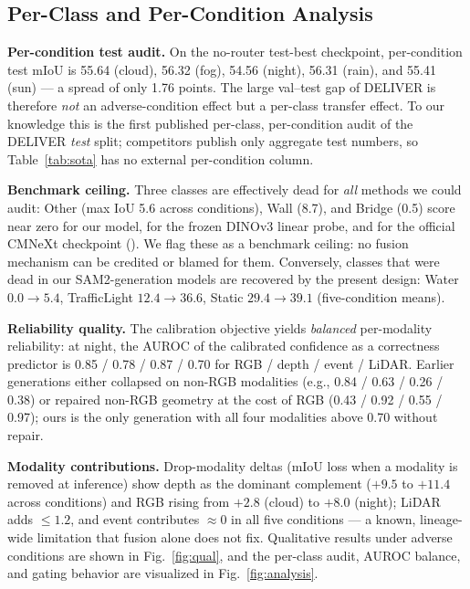 \subsection{Per-Class and Per-Condition Analysis}
\label{sec:analysis}

\textbf{Per-condition test audit.}
On the no-router test-best checkpoint, per-condition test mIoU is
55.64 (cloud), 56.32 (fog), 54.56 (night), 56.31 (rain), and 55.41
(sun) --- a spread of only 1.76 points. The large val--test gap of
DELIVER is therefore \emph{not} an adverse-condition effect but a
per-class transfer effect. To our knowledge this is the first
published per-class, per-condition audit of the DELIVER \emph{test}
split; competitors publish only aggregate test numbers, so
Table~\ref{tab:sota} has no external per-condition column.

\textbf{Benchmark ceiling.}
Three classes are effectively dead for \emph{all} methods we could
audit: Other (max IoU 5.6 across conditions), Wall (8.7), and Bridge
(0.5) score near zero for our model, for the frozen DINOv3 linear
probe, and for the official CMNeXt checkpoint
(). We flag these as a benchmark ceiling: no fusion
mechanism can be credited or blamed for them. Conversely, classes that
were dead in our SAM2-generation models are recovered by the present
design: Water $0.0\rightarrow5.4$, TrafficLight $12.4\rightarrow36.6$,
Static $29.4\rightarrow39.1$ (five-condition means).

\textbf{Reliability quality.}
The calibration objective yields \emph{balanced} per-modality
reliability: at night, the AUROC of the calibrated confidence as a
correctness predictor is 0.85 / 0.78 / 0.87 / 0.70 for RGB / depth /
event / LiDAR. Earlier generations either collapsed on non-RGB
modalities (e.g., 0.84 / 0.63 / 0.26 / 0.38) or repaired non-RGB
geometry at the cost of RGB (0.43 / 0.92 / 0.55 / 0.97); ours is the
only generation with all four modalities above 0.70 without repair.

\textbf{Modality contributions.}
Drop-modality deltas (mIoU loss when a modality is removed at
inference) show depth as the dominant complement ($+9.5$ to $+11.4$
across conditions) and RGB rising from $+2.8$ (cloud) to $+8.0$
(night); LiDAR adds ${\leq}1.2$, and event contributes ${\approx}0$ in
all five conditions --- a known, lineage-wide limitation that fusion
alone does not fix. Qualitative results under adverse conditions are
shown in Fig.~\ref{fig:qual}, and the per-class audit, AUROC balance,
and gating behavior are visualized in Fig.~\ref{fig:analysis}.

